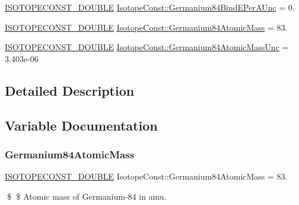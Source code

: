 \begin{DoxyCompactItemize}
\mbox{\hyperlink{group___isotope_const-_macros_ga8f45a7272ce02c0b4c65c44636ed719a}{I\+S\+O\+T\+O\+P\+E\+C\+O\+N\+S\+T\+\_\+\+D\+O\+U\+B\+LE}} \mbox{\hyperlink{group___isotope_const-_germanium-_ge84_ga38dc0b97ffa443593da71b91e98a58aa}{Isotope\+Const\+::\+Germanium84\+Bind\+E\+Per\+A\+Unc}} = 0.
\item 
\mbox{\hyperlink{group___isotope_const-_macros_ga8f45a7272ce02c0b4c65c44636ed719a}{I\+S\+O\+T\+O\+P\+E\+C\+O\+N\+S\+T\+\_\+\+D\+O\+U\+B\+LE}} \mbox{\hyperlink{group___isotope_const-_germanium-_ge84_gac01de22ba098e35147de0097f6e63a09}{Isotope\+Const\+::\+Germanium84\+Atomic\+Mass}} = 83.
\item 
\mbox{\hyperlink{group___isotope_const-_macros_ga8f45a7272ce02c0b4c65c44636ed719a}{I\+S\+O\+T\+O\+P\+E\+C\+O\+N\+S\+T\+\_\+\+D\+O\+U\+B\+LE}} \mbox{\hyperlink{group___isotope_const-_germanium-_ge84_ga7cca52fdcbe697d3dbdf254610449f69}{Isotope\+Const\+::\+Germanium84\+Atomic\+Mass\+Unc}} = 3.\+403e-\/06
\end{DoxyCompactItemize}


\subsection{Detailed Description}


\subsection{Variable Documentation}
\mbox{\label{group___isotope_const-_germanium-_ge84_gac01de22ba098e35147de0097f6e63a09}} 
\subsubsection{\texorpdfstring{Germanium84\+Atomic\+Mass}{Germanium84AtomicMass}}
{\footnotesize\ttfamily \mbox{\hyperlink{group___isotope_const-_macros_ga8f45a7272ce02c0b4c65c44636ed719a}{I\+S\+O\+T\+O\+P\+E\+C\+O\+N\+S\+T\+\_\+\+D\+O\+U\+B\+LE}} Isotope\+Const\+::\+Germanium84\+Atomic\+Mass = 83.}

\$ \$ Atomic mass of Germanium-\/84 in amu. \mbox{\label{group___isotope_const-_germanium-_ge84_ga7cca52fdcbe697d3dbdf254610449f69}} 
